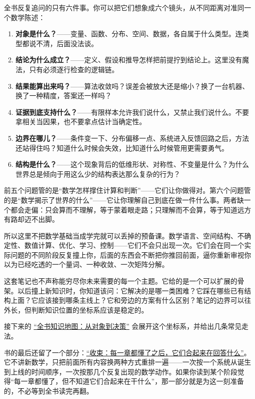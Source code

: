 全书反复追问的只有六件事。你可以把它们想象成六个镜头，从不同距离对准同一个数学陈述：

\begin{enumerate}
  \item \textbf{对象是什么？}——变量、函数、分布、空间、数据，各自属于什么类型。连类型都说不清，后面没法谈。
  \item \textbf{结论为什么成立？}——定义、假设和推导怎样把前提拧到结论上。这里没有魔法，只有必须逐行检查的逻辑链。
  \item \textbf{结果能算出来吗？}——算法收敛吗？误差会被放大还是缩小？换了一台机器、换了一种精度，答案还一样吗？
  \item \textbf{证据到底支持什么？}——有限样本允许我们说什么，又禁止我们说什么。不要拿相关当因果，也不要拿点估计当确定性。
  \item \textbf{边界在哪儿？}——条件变一下、分布偏移一点、系统进入反馈回路之后，方法还站得住吗？知道什么时候会失效，比知道什么时候管用更需要勇气。
  \item \textbf{结构是什么？}——这个现象背后的低维形状、对称性、不变量是什么？为什么世界总是倾向于用这么少的结构表达那么复杂的行为？
\end{enumerate}

前五个问题管的是“数学怎样撑住计算和判断”——它们让你做得对。第六个问题管的是“数学揭示了世界的什么”——它让你理解自己到底在做一件什么事。两者缺一个都会走偏：只会算而不理解，等于蒙着眼走路；只理解而不会算，等于知道远方有路却迈不出脚。

所以这里不把数学基础当成学完就可以丢掉的预备课。数学语言、空间结构、不确定性、数值计算、优化、学习、控制——它们不会只出现一次。它们会在同一个实际问题的不同阶段反复撞上你，后面的东西会不断把你推回前面，逼你重新审视你以为已经吃透的一个量词、一种收敛、一次矩阵分解。

这套笔记也不声称能穷尽你未来需要的每一个主题。它给的是一个可以扩展的骨架。以后撞上新知识时，你知道该问：它解决的是哪一类困难？它踩在哪些已有结构上面？它应该接到哪条主线上？它和旁边的方案有什么区别？笔记的边界可以往外长，但判断知识位置的坐标系应该是稳定的。

接下来的 \hyperref[ch:002]{“全书知识地图：从对象到决策”} 会展开这个坐标系，并给出几条常见走法。

书的最后还留了一个部分：\hyperref[ch:147]{“收束：每一章都懂了之后，它们合起来在回答什么”}。它不讲新数学，只把前面所有内容换两种方式重排一遍——一次按一个系统从诞生到上线的时间顺序，一次按那几个反复出现的数学动作。如果你读到某个阶段觉得“每一章都懂了，但不知道它们合起来在干什么”，那一部分就是为这一刻准备的，不必等到全书读完再翻。